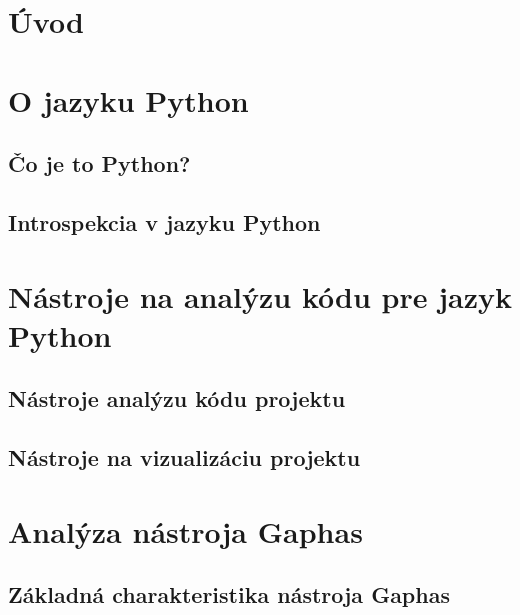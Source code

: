 \documentclass[11pt,oneside,final]{fithesis2}
\begin{document}
 \FrontMatter  
 \ThesisTitlePage

\begin{ThesisDeclaration}
\DeclarationText
\AdvisorName
\end{ThesisDeclaration}

\begin{ThesisThanks}
\end{ThesisThanks}

\begin{ThesisAbstract}
\end{ThesisAbstract}

\begin{ThesisKeyWords}
\end{ThesisKeyWords}



\MainMatter  
\tableofcontents

\chapter{Úvod}
\chapter{O jazyku Python}
	\section{Čo je to Python?}
	\section{Introspekcia v jazyku Python}
\chapter{Nástroje na analýzu kódu pre jazyk Python}
	\section{Nástroje analýzu kódu projektu}	
	\section{Nástroje na vizualizáciu projektu}
    
\chapter{Analýza nástroja Gaphas}

	\section{Základná charakteristika nástroja Gaphas}
\end{document}
